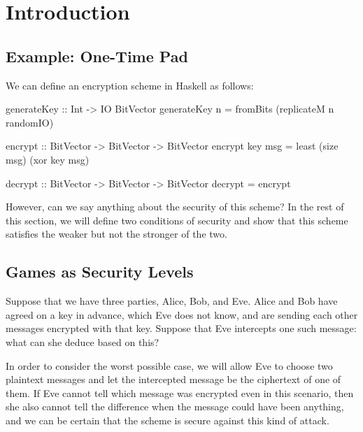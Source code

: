 \chapter{Introduction}



\section{Example: One-Time Pad}

We can define an encryption scheme in Haskell as follows:
\begin{code}
    generateKey :: Int -> IO BitVector
    generateKey n = fromBits (replicateM n randomIO)

    encrypt :: BitVector -> BitVector -> BitVector
    encrypt key msg = least (size msg) (xor key msg)

    decrypt :: BitVector -> BitVector -> BitVector
    decrypt = encrypt
\end{code}

However, can we say anything about the security of this scheme?  In the rest of this section, we will define two
conditions of security and show that this scheme satisfies the weaker but not the stronger of the two.


\section{Games as Security Levels}

Suppose that we have three parties, Alice, Bob, and Eve.  Alice and Bob have agreed on a key in advance, which Eve does
not know, and are sending each other messages encrypted with that key.  Suppose that Eve intercepts one such message:
what can she deduce based on this?

In order to consider the worst possible case, we will allow Eve to choose two plaintext messages and let the intercepted
message be the ciphertext of one of them.  If Eve cannot tell which message was encrypted even in this scenario, then
she also cannot tell the difference when the message could have been anything, and we can be certain that the scheme is
secure against this kind of attack.

